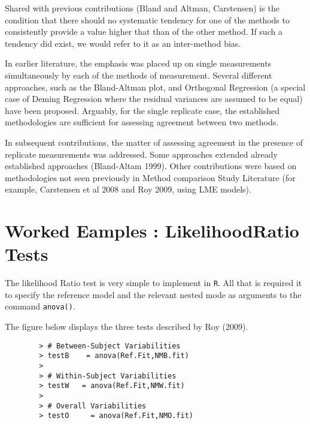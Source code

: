 \documentclass[12pt, a4paper]{report}
\theoremstyle{plain}
\theoremstyle{definition}
\theoremstyle{remark}
\begin{document}
Shared with previous contributions (Bland and Altman, Carstensen) is the condition that there should no systematic  tendency for one of the methods to consistently provide a value higher that than of the other method. If such a tendency did exist, we would refer to it as an inter-method bias.

In earlier literature, the emphasis was placed up on single measurements simultaneously by each of the methods of measurement. Several different approaches, such as the Bland-Altman plot, and Orthogonal Regression (a special case of Deming Regression where the residual variances are assumed to be equal) have been proposed. Arguably, for the single replicate case, the established methodologies are sufficient for assessing agreement between two methods.

In subsequent contributions, the matter of assessing agreement in the presence  of replicate measurements was addressed. Some approaches extended already established approaches (Bland-Altam 1999).  Other contributions were based on methodologies not seen previously in Method comparison Study Literature  (for example, Carstensen et al 2008 and Roy 2009, using LME models). 

\section{Worked Eamples : LikelihoodRatio Tests}


The likelihood Ratio test is very simple to implement in \texttt{R}. All that is required it to specify the reference model and the relevant nested mode as arguments to the command \texttt{anova()}.
	
The figure below displays the three tests described by Roy (2009).
	
	\begin{framed}
		\begin{verbatim}
		> # Between-Subject Variabilities
		> testB    = anova(Ref.Fit,NMB.fit) 
		>         
		> # Within-Subject Variabilities                
		> testW   = anova(Ref.Fit,NMW.fit) 
		>                       
		> # Overall Variabilities
		> testO     = anova(Ref.Fit,NMO.fit)                        
		
		
		\end{verbatim}
	\end{framed}
	
	
	
	
	
\end{document}
